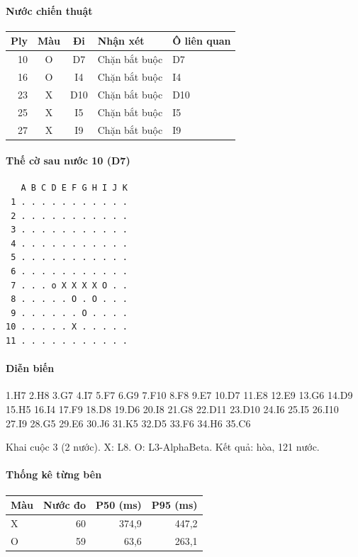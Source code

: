 \paragraph{Nước chiến thuật}
\begin{center}\small
\begin{tabular}{@{}rccll@{}}
\toprule
Ply & Màu & Đi & Nhận xét & Ô liên quan \\
\midrule
10 & O & D7 & Chặn bắt buộc & D7 \\
16 & O & I4 & Chặn bắt buộc & I4 \\
23 & X & D10 & Chặn bắt buộc & D10 \\
25 & X & I5 & Chặn bắt buộc & I5 \\
27 & X & I9 & Chặn bắt buộc & I9 \\
\bottomrule
\end{tabular}
\end{center}
\paragraph{Thế cờ sau nước 10 (D7)}
\begin{verbatim}
   A B C D E F G H I J K
 1 . . . . . . . . . . .
 2 . . . . . . . . . . .
 3 . . . . . . . . . . .
 4 . . . . . . . . . . .
 5 . . . . . . . . . . .
 6 . . . . . . . . . . .
 7 . . . o X X X X O . .
 8 . . . . . O . O . . .
 9 . . . . . . O . . . .
10 . . . . . X . . . . .
11 . . . . . . . . . . .
\end{verbatim}
\paragraph{Diễn biến}
{\footnotesize 1.H7 2.H8 3.G7 4.I7 5.F7 6.G9 7.F10 8.F8 9.E7 10.D7 11.E8 12.E9 13.G6 14.D9 15.H5 16.I4 17.F9 18.D8 19.D6 20.I8 21.G8 22.D11 23.D10 24.I6 25.I5 26.I10 27.I9 28.G5 29.E6 30.J6 31.K5 32.D5 33.F6 34.H6 35.C6\par}
Khai cuộc 3 (2 nước). X: L8. O: L3-AlphaBeta. Kết quả: hòa, 121 nước.
\paragraph{Thống kê từng bên}
\begin{center}\small
\begin{tabular}{@{}lrrr@{}}
\toprule
Màu & Nước đo & P50 (ms) & P95 (ms) \\
\midrule
X & 60 & 374,9 & 447,2 \\
O & 59 & 63,6 & 263,1 \\
\bottomrule
\end{tabular}
\end{center}
